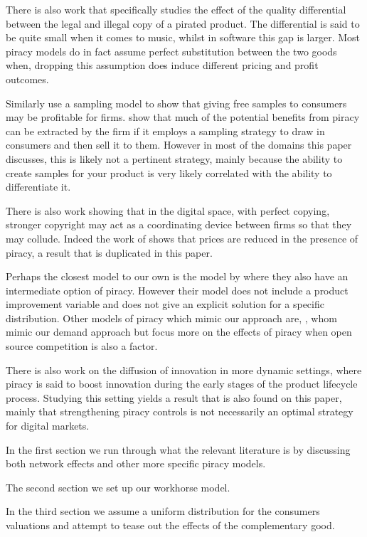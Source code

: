\documentclass{article}
\begin{document}
There is also work that specifically studies the effect of the quality differential between the legal and illegal copy of a pirated product. \cite{GL03} The differential is said to be quite small when it comes to music, whilst in software this gap is larger. Most piracy models do in fact assume perfect substitution between the two goods when, dropping this assumption does induce different pricing and profit outcomes. 

Similarly \cite{PW06b} use a sampling model to show that giving free samples to consumers may be profitable for firms. \cite{C05} show that much of the potential benefits from piracy can be extracted by the firm if it employs a sampling strategy to draw in consumers and then sell it to them. However in most of the domains this paper discusses, this is likely not a pertinent strategy, mainly because the ability to create samples for your product is very likely correlated with the ability to differentiate it.  

There is also work showing that in the digital space, with perfect copying, stronger copyright may act as a coordinating device between firms so that they may collude\citep{J08}. Indeed the work of \citep{S04} shows that prices are reduced in the presence of piracy, a result that is duplicated in this paper.

Perhaps the closest model to our own is the model by \cite{CRP91} where they also have an intermediate option of piracy. However their model does not include a product improvement variable and does not give an explicit solution for a specific distribution. Other models of piracy which mimic our approach are, \cite{MRSS17}, whom mimic our demand approach but focus more on the effects of piracy when open source competition is also a factor. 

There is also work on the diffusion of innovation in more dynamic settings, where piracy is said to boost innovation during the early stages of the product lifecycle process. Studying this setting yields a result that is also found on this paper, mainly that strengthening piracy controls is not necessarily an optimal strategy for digital markets. \citep{G03}  \citep{GMM95} 


In the first section we run through what the relevant literature is by discussing both network effects and other more specific piracy models. 

The second section we set up our workhorse model.

In the third section we assume a uniform distribution for the consumers valuations and attempt to tease out the effects of the complementary good. 
\end{document}
